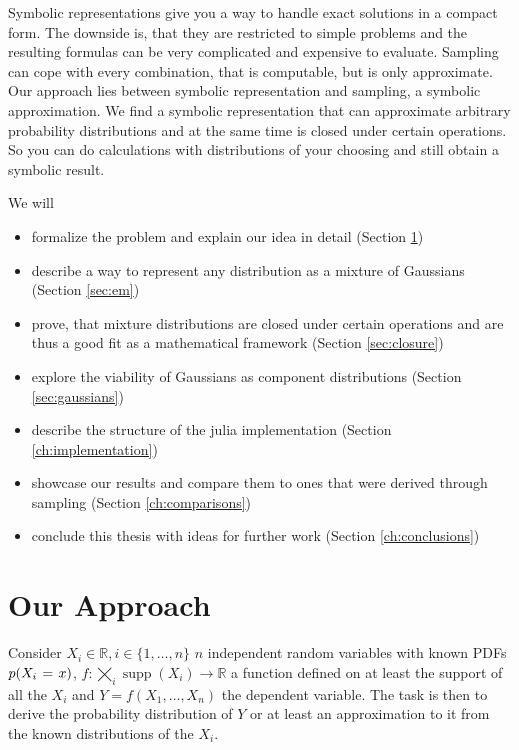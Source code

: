 \documentclass[11pt,a4paper]{book}
\DeclareMathOperator{\supp}{supp}
\begin{document}
Symbolic representations give you a way to handle exact solutions in a compact
form. The downside is, that they are restricted to simple problems and the
resulting formulas can be very complicated and expensive to evaluate. Sampling
can cope with every combination, that is computable, but is only
approximate. Our approach lies between symbolic representation and sampling, a
symbolic approximation. We find a symbolic representation that can approximate
arbitrary probability distributions and at the same time is closed under certain
operations. So you can do calculations with distributions of your choosing and
still obtain a symbolic result.

We will
\begin{itemize}
\item formalize the problem and explain our idea in detail (Section
  \ref{ch:idea})
\item describe a way to represent any distribution as a mixture of Gaussians
  (Section \ref{sec:em})
\item prove, that mixture distributions are closed under certain operations and
  are thus a good fit as a mathematical framework (Section \ref{sec:closure})
\item explore the viability of Gaussians as component distributions (Section
  \ref{sec:gaussians})
\item describe the structure of the julia implementation (Section
  \ref{ch:implementation})
\item showcase our results and compare them to ones that were derived through
  sampling (Section \ref{ch:comparisons})
\item conclude this thesis with ideas for further work (Section
  \ref{ch:conclusions})
\end{itemize}

\chapter{Our Approach}
\label{ch:idea}

Consider $X_{i} \in \mathbb{R}, i \in \{ 1, \dots, n \}$ $n$ independent random
variables with known PDFs $p(X_{i}\hspace{0.1em}=\hspace{0.1em}x)$,
$f : \bigtimes_{i} \supp(X_{i}) \rightarrow \mathbb{R}$ a function defined on at
least the support of all the $X_{i}$ and $Y = f(X_{1}, \dots, X_{n})$ the
dependent variable. The task is then to derive the probability distribution of
$Y$ or at least an approximation to it from the known distributions of the
$X_{i}$.
\end{document}
